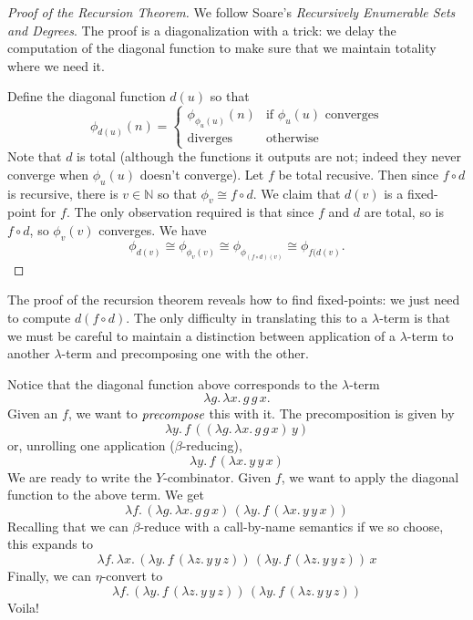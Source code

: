 \documentclass{article}
\begin{document}
\begin{proof}[Proof of the Recursion Theorem] 
  We follow Soare's \emph{Recursively Enumerable Sets and Degrees}. The proof is
  a diagonalization with a trick: we delay the computation of the diagonal
  function to make sure that we maintain totality where we need it.

  Define the diagonal function $d(u)$ so that
  \[
    \phi_{d(u)}(n) = 
    \begin{cases} 
      \phi_{\phi_u(u)}(n) & \text{if $\phi_u(u)$ converges} \\
          \text{diverges} & \text{otherwise}
    \end{cases}
  \]
  Note that $d$ is total (although the functions it outputs are not; indeed they
  never converge when $\phi_u(u)$ doesn't converge). Let $f$ be total recusive.
  Then since $f \circ d$ is recursive, there is $v \in \mathbb{N}$ so that
  $\phi_v \cong f \circ d$. We claim that $d(v)$ is a fixed-point for $f$.
  The only observation required is that since $f$ and $d$ are total, so is $f
  \circ d$, so $\phi_v(v)$ converges. We have
  \[
    \phi_{d(v)} \cong \phi_{\phi_v(v)} \cong \phi_{\phi_{(f \circ
    d)(v)}}
      \cong {\phi_{f(d(v)}}.
  \]
\end{proof}
The proof of the recursion theorem reveals how to find fixed-points: we just
need to compute $d(f \circ d)$. The only difficulty in translating this to a
$\lambda$-term is that we must be careful to maintain a distinction between
application of a $\lambda$-term to another $\lambda$-term and precomposing one
with the other.

Notice that the diagonal function above corresponds to the $\lambda$-term
\[
  \lambda g. \, \lambda x. \, g \, g \, x.
\]
Given an $f$, we want to $\emph{precompose}$ this with it. The precomposition is
given by
\[
  \lambda y. \, f \, ((\lambda g. \, \lambda x. \, g \, g \, x) \, y)
\]
or, unrolling one application ($\beta$-reducing),
\[
  \lambda y. \, f \, (\lambda x. \, y \, y \, x)
\]
We are ready to write the $Y$-combinator. Given $f$, we want to apply the
diagonal function to the above term. We get
\[
\lambda f. \, (\lambda g. \, \lambda x. \, g \, g \, x) \, (\lambda y. \, f \,
(\lambda x. \, y \, y \, x))
\]
Recalling that we can $\beta$-reduce with a call-by-name semantics if we so
choose, this expands to
\[
  \lambda f. \, \lambda x. \, 
    (\lambda y. \, f \, (\lambda z. \, y \, y \, z)) \, 
    (\lambda y. \, f \, (\lambda z. \, y \, y \, z)) \, 
    x
\]
Finally, we can $\eta$-convert to 
\[
  \lambda f. \,  
    (\lambda y. \, f \, (\lambda z. \, y \, y \, z)) \, 
    (\lambda y. \, f \, (\lambda z. \, y \, y \, z))
\]
Voila!


 
\end{document}
